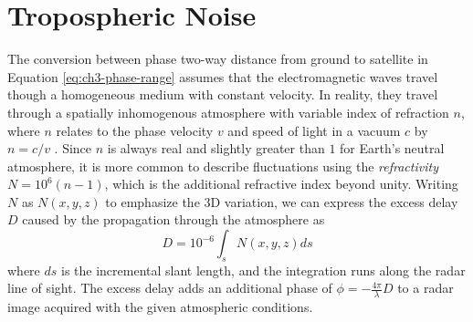 


\section{Tropospheric Noise}
\label{sec:ch3-noise-tropo}



The conversion between phase two-way distance from ground to satellite in Equation \eqref{eq:ch3-phase-range} assumes that the electromagnetic waves travel though a homogeneous medium with constant velocity. In reality, they travel through a spatially inhomogenous atmosphere with variable index of refraction $n$, where $n$ relates to the phase velocity $v$ and speed of light in a vacuum $c$ by $n = c/v$ \citep{Zebker1997AtmosphericEffectsInterferometric, Hanssen2001RadarInterferometryData, Liu2012SatelliteRadarInterferometry}.  Since $n$ is always real and slightly greater than $1$ for Earth's neutral atmosphere, it is more common to describe fluctuations using the \emph{refractivity} $N = 10^{6}(n - 1)$, which is the additional refractive index beyond unity.
Writing $N$ as $N(x,y,z)$ to emphasize the 3D variation, we can express the excess delay $D$ caused by the propagation through the atmosphere as
\begin{equation}
	D = 10^{-6} \int_{s} N(x, y, z) ds
\end{equation}
where $ds$ is the incremental slant length, and the integration runs along the radar line of sight. The excess delay adds an additional phase of $\phi = - \frac{4 \pi}{\lambda} D$ to a radar image acquired with the given atmospheric conditions.


